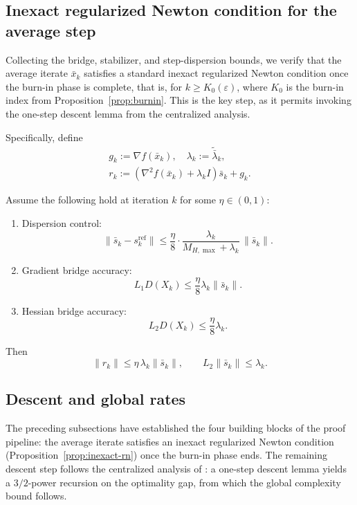 \documentclass[review,onefignum,onetabnum]{siamart171218}
\begin{document}
	\subsection{Inexact regularized Newton condition for the average step}\label{ssec:inexact}
	Collecting the bridge, stabilizer, and step-dispersion bounds, we
	verify that the average iterate $\bar x_k$ satisfies a standard
	inexact regularized Newton condition once the burn-in phase
	is complete, that is, for $k\ge K_0(\varepsilon)$, where $K_0$ is the
	burn-in index from Proposition~\ref{prop:burnin}.
	This is the key step, as it permits invoking the one-step descent
	lemma from the centralized analysis.
	
	Specifically, define
	\begin{gather*}
		g_k:=\nabla f(\bar x_k),\quad
		\lambda_k:=\tilde{\bar\lambda}_k,\\
		r_k:=(\nabla^2 f(\bar x_k)+\lambda_k I)\bar s_k+g_k.
	\end{gather*}
	
	\begin{proposition}\label{prop:inexact-rn}
		Assume the following hold at iteration $k$ for some $\eta\in(0,1)$:
		\begin{enumerate}[leftmargin=1.2em,itemsep=2pt]
			\item Dispersion control:
			\[
			\|\bar s_k-s_k^{\mathrm{ref}}\|\le \frac{\eta}{8}\cdot \frac{\lambda_k}{M_{H,\max}+\lambda_k}\,\|\bar s_k\|.
			\]
			\item Gradient bridge accuracy:
			\[
			L_1D(X_k)\le \frac{\eta}{8}\lambda_k\|\bar s_k\|.
			\]
			\item Hessian bridge accuracy:
			\[
			L_2D(X_k)\le \frac{\eta}{8}\lambda_k.
			\]
		\end{enumerate}
		Then
		\[
		\|r_k\|\le \eta\,\lambda_k\|\bar s_k\|,
		\qquad
		L_2\|\bar s_k\|\le \lambda_k.
		\]
	\end{proposition}
	
	\subsection{Descent and global rates}\label{ssec:descent}
	The preceding subsections have established the four building blocks
	of the proof pipeline: the average
	iterate satisfies an inexact regularized Newton condition
	(Proposition~\ref{prop:inexact-rn}) once the burn-in phase ends.
	The remaining descent step follows the centralized analysis of
	\citet{mishchenko2023rn}: a one-step descent lemma yields a
	$3/2$-power recursion on the optimality gap, from which the global
	complexity bound follows.
	
\end{document}

